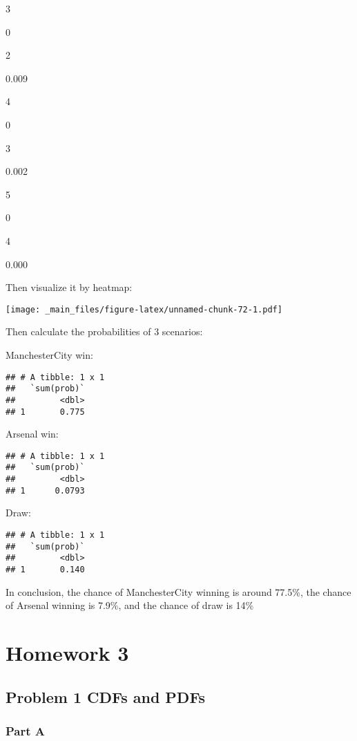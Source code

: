 \documentclass[
]{article}
\begin{document}
3

0

2

0.009

4

0

3

0.002

5

0

4

0.000

Then visualize it by heatmap:

\texttt{[image: \_main\_files/figure-latex/unnamed-chunk-72-1.pdf]}

Then calculate the probabilities of 3 scenarios:

ManchesterCity win:

\begin{verbatim}
## # A tibble: 1 x 1
##   `sum(prob)`
##         <dbl>
## 1       0.775
\end{verbatim}

Arsenal win:

\begin{verbatim}
## # A tibble: 1 x 1
##   `sum(prob)`
##         <dbl>
## 1      0.0793
\end{verbatim}

Draw:

\begin{verbatim}
## # A tibble: 1 x 1
##   `sum(prob)`
##         <dbl>
## 1       0.140
\end{verbatim}

In conclusion, the chance of ManchesterCity winning is around 77.5\%, the chance of Arsenal winning is 7.9\%, and the chance of draw is 14\%

\hypertarget{homework-3}{%
\section{Homework 3}\label{homework-3}}

\hypertarget{problem-1-cdfs-and-pdfs}{%
\subsection{Problem 1 CDFs and PDFs}\label{problem-1-cdfs-and-pdfs}}

\hypertarget{part-a-6}{%
\subsubsection{Part A}\label{part-a-6}}
\end{document}
